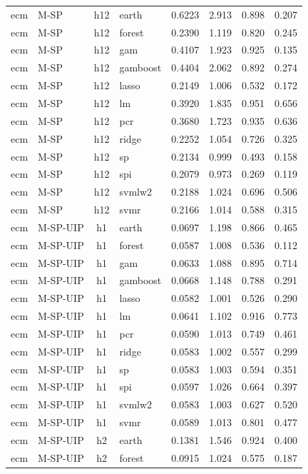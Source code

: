\begin{ThreePartTable}
\begin{longtable}[t]{llclcccc}
\addlinespace
ecm & M-SP & h12 & earth & 0.6223 & 2.913 & 0.898 & 0.207\\
ecm & M-SP & h12 & forest & 0.2390 & 1.119 & 0.820 & 0.245\\
ecm & M-SP & h12 & gam & 0.4107 & 1.923 & 0.925 & 0.135\\
ecm & M-SP & h12 & gamboost & 0.4404 & 2.062 & 0.892 & 0.274\\
ecm & M-SP & h12 & lasso & 0.2149 & 1.006 & 0.532 & 0.172\\
ecm & M-SP & h12 & lm & 0.3920 & 1.835 & 0.951 & 0.656\\
ecm & M-SP & h12 & pcr & 0.3680 & 1.723 & 0.935 & 0.636\\
ecm & M-SP & h12 & ridge & 0.2252 & 1.054 & 0.726 & 0.325\\
ecm & M-SP & h12 & sp & 0.2134 & 0.999 & 0.493 & 0.158\\
ecm & M-SP & h12 & spi & 0.2079 & 0.973 & 0.269 & 0.119\\
ecm & M-SP & h12 & svmlw2 & 0.2188 & 1.024 & 0.696 & 0.506\\
ecm & M-SP & h12 & svmr & 0.2166 & 1.014 & 0.588 & 0.315\\
\addlinespace
ecm & M-SP-UIP & h1 & earth & 0.0697 & 1.198 & 0.866 & 0.465\\
ecm & M-SP-UIP & h1 & forest & 0.0587 & 1.008 & 0.536 & 0.112\\
ecm & M-SP-UIP & h1 & gam & 0.0633 & 1.088 & 0.895 & 0.714\\
ecm & M-SP-UIP & h1 & gamboost & 0.0668 & 1.148 & 0.788 & 0.291\\
ecm & M-SP-UIP & h1 & lasso & 0.0582 & 1.001 & 0.526 & 0.290\\
ecm & M-SP-UIP & h1 & lm & 0.0641 & 1.102 & 0.916 & 0.773\\
ecm & M-SP-UIP & h1 & pcr & 0.0590 & 1.013 & 0.749 & 0.461\\
ecm & M-SP-UIP & h1 & ridge & 0.0583 & 1.002 & 0.557 & 0.299\\
ecm & M-SP-UIP & h1 & sp & 0.0583 & 1.003 & 0.594 & 0.351\\
ecm & M-SP-UIP & h1 & spi & 0.0597 & 1.026 & 0.664 & 0.397\\
ecm & M-SP-UIP & h1 & svmlw2 & 0.0583 & 1.003 & 0.627 & 0.520\\
ecm & M-SP-UIP & h1 & svmr & 0.0589 & 1.013 & 0.801 & 0.477\\
\addlinespace
ecm & M-SP-UIP & h2 & earth & 0.1381 & 1.546 & 0.924 & 0.400\\
ecm & M-SP-UIP & h2 & forest & 0.0915 & 1.024 & 0.575 & 0.187\\

\end{longtable}
\end{ThreePartTable}
